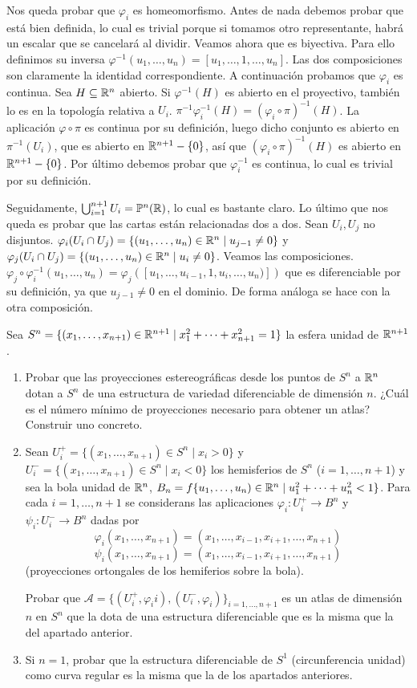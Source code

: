 \documentclass[twoside]{article}
\begin{document}
\begin{solucion}
Nos queda probar que $\varphi_i$ es homeomorfismo. Antes de nada debemos probar que está bien definida, lo cual es trivial porque si tomamos otro representante, habrá un escalar que se cancelará al dividir. Veamos ahora que es biyectiva. Para ello definimos su inversa $\varphi^{-1}(u_1,\dots,u_n)=[u_1,\dots,1,\dots,u_n]$. Las dos composiciones son claramente la identidad correspondiente. A continuación probamos que $\varphi_i$ es continua. Sea $H\subseteq\mathbb{R}^n$ abierto. Si $\varphi^{-1}(H)$ es abierto en el proyectivo, también lo es en la topología relativa a $U_i$. $\pi^{-1}\varphi_i^{-1}(H)=(\varphi_i\circ\pi)^{-1}(H)$. La aplicación $\varphi\circ\pi$ es continua por su definición, luego dicho conjunto es abierto en $\pi^{-1}(U_i)$, que es abierto en $\mathbb{R}^{n+1}-\{0\}$, así que $(\varphi_i\circ\pi)^{-1}(H)$ es abierto en $\mathbb{R}^{n+1}-\{0\}$. Por último debemos probar que $\varphi_i^{-1}$ es continua, lo cual es trivial por su definición.

Seguidamente, $\bigcup_{i=1}^{n+1} U_i=\mathbb{P}^n(\mathbb{R})$, lo cual es bastante claro. Lo último que nos queda es probar que las cartas están relacionadas dos a dos. Sean $U_i,U_j$ no disjuntos. $\varphi_i(U_i\cap U_j)=\{(u_1,\dots,u_n)\in\mathbb{R}^n\mid u_{j-1}\neq 0\}$ y $\varphi_j(U_i\cap U_j)=\{(u_1,\dots,u_n)\in\mathbb{R}^n\mid u_{i}\neq 0\}$. Veamos las composiciones. $\varphi_j\circ\varphi^{-1}_i(u_1,\dots,u_n)=\varphi_j([u_1,\dots,u_{i-1},1,u_i,\dots,u_n)])$ que es diferenciable por su definición, ya que $u_{j-1}\neq 0$ en el dominio. De forma análoga se hace con la otra composición.
\end{solucion}
\newpage
\begin{ejercicio}{2}
Sea $S^n = \{(x_1,\dots, x_{n+1})\in \mathbb{R}^{n+1}\mid x^2_1
+\cdots+x^2_{n+1} = 1\}$ la esfera
unidad de $\mathbb{R}^{n+1}$.\
\begin{enumerate}
\item Probar que las proyecciones estereográficas desde los puntos de $S^n$ a $\mathbb{R}^n$
dotan a $S^n$ de una estructura de variedad diferenciable de dimensión $n$.
¿Cuál es el número mínimo de proyecciones necesario para obtener un atlas?
Construir uno concreto.
\item Sean $U^+_i = \{(x_1, \dots, x_{n+1}) \in S^n\mid x_i > 0\}$ y $U^-_i = \{(x_1, \dots, x_{n+1}) \in S^n\mid x_i <
0\}$ los hemisferios de $S^n$ ($i = 1,\dots, n + 1$) y sea la bola unidad de $\mathbb{R}^n$,
$B_n = f\{u_1,\dots, u_n) \in \mathbb{R}^n\mid u^2_1
+ \cdots + u^2_n < 1\}$. Para cada $i = 1, \dots, n + 1$ se considerans las aplicaciones $φ_i : U_i^+ \to B^n$ y $ψ_i : U_i^- \to B^n$ dadas por
\[ φ_i(x_1,\dots,x_{n+1}) = (x_1,\dots,x_{i-1},x_{i+1},\dots,x_{n+1}) \]
\[ ψ_i(x_1,\dots,x_{n+1}) = (x_1,\dots,x_{i-1},x_{i+1},\dots,x_{n+1}) \]
(proyecciones ortongales de los hemiferios sobre la bola). 

Probar que $\mathcal{A} = \{(U_i^+,φ_ii),(U_i^-,φ_i)\}_{i=1,\dots,n+1}$ es un atlas de dimensión $n$ en $S^n$ que la dota de una estructura diferenciable que es la misma que la del apartado anterior.
\item Si $n=1$, probar que la estructura diferenciable de $S^1$ (circunferencia unidad) como curva regular es la misma que la de los apartados anteriores.
\end{enumerate}
\end{ejercicio}
\end{document}
